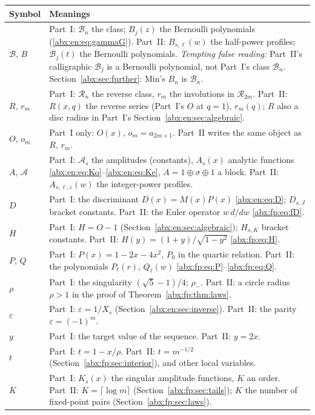 \documentclass[11pt,letterpaper]{article}
\numberwithin{equation}{section}
\theoremstyle{remark}\newtheorem{remark}[theorem]{Remark}
\newcommand{\BB}{\mathcal B}
\newcommand{\RR}{\mathcal R}
\newcommand{\eps}{\varepsilon}
\begin{document}
\begin{longtable}{@{}>{\raggedright\arraybackslash}p{} >{\raggedright\arraybackslash}p{}@{}}
\toprule
Symbol & Meanings\\
\midrule
\endhead
$\mathcal B$, $B$ & Part~I: $\BB_n$ the class; $B_j(z)$ the Bernoulli polynomials (\eqref{abx:en:eq:gammaG}). Part~II: $B_{s,\ell}(w)$ the half-power profiles; $\mathcal B_j(t)$ the Bernoulli polynomials. \emph{Tempting false reading:} Part~II's calligraphic $\mathcal B_j$ is a Bernoulli polynomial, not Part~I's class $\BB_n$. Section~\ref{abx:sec:further}: Min's $B_n$ is $\BB_n$.\\
$R$, $r_m$ & Part~I: $\RR_n$ the reverse class, $r_m$ the involutions in $\RR_{2m}$. Part~II: $R(x,q)$ the reverse series (Part~I's $O$ at $q=1$), $r_m(q)$; $R$ also a disc radius in Part~I's Section~\ref{abx:en:sec:algebraic}.\\
$O$, $o_m$ & Part~I only: $O(x)$, $o_m=a_{2m+1}$. Part~II writes the same object as $R$, $r_m$.\\
$A$, $\mathcal A$ & Part~I: $\mathcal A_s$ the amplitudes (constants), $A_s(x)$ analytic functions \eqref{abx:en:eq:Ko}--\eqref{abx:en:eq:Ke}, $A=1\oplus\sigma\oplus1$ a block. Part~II: $A_{s,\ell,\eps}(w)$ the integer-power profiles.\\
$D$ & Part~I: the discriminant $D(x)=M(x)P(x)$ \eqref{abx:en:eq:D}; $D_{s,J}$ bracket constants. Part~II: the Euler operator $w\,d/dw$ \eqref{abx:fp:eq:fD}.\\
$H$ & Part~I: $H=O-1$ (Section~\ref{abx:en:sec:algebraic}); $H_{s,K}$ bracket constants. Part~II: $H(y)=(1+y)/\sqrt{1-y^2}$ \eqref{abx:fp:eq:H}.\\
$P$, $Q$ & Part~I: $P(x)=1-2x-4x^2$, $P_0$ in the quartic relation. Part~II: the polynomials $P_\ell(r)$, $Q_\ell(w)$ \eqref{abx:fp:eq:P}--\eqref{abx:fp:eq:Q}.\\
$\rho$ & Part~I: the singularity $(\sqrt5-1)/4$; $\rho_-$. Part~II: a circle radius $\rho>1$ in the proof of Theorem~\ref{abx:fp:thm:laws}.\\
$\eps$ & Part~I: $\eps=1/X_s$ (Section~\ref{abx:en:sec:inverse}). Part~II: the parity $\eps=(-1)^m$.\\
$y$ & Part~I: the target value of the sequence. Part~II: $y=2x$.\\
$t$ & Part~I: $t=1-x/\rho$. Part~II: $t=m^{-1/2}$ (Section~\ref{abx:fp:sec:interior}), and other local variables.\\
$K$ & Part~I: $K_s(x)$ the singular amplitude functions, $K$ an order. Part~II: $K=\lceil\log m\rceil$ (Section~\ref{abx:fp:sec:tails}); $K$ the number of fixed-point pairs (Section~\ref{abx:fp:sec:laws}).\\

\end{longtable}
\end{document}

